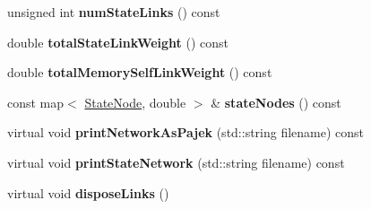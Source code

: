 \begin{DoxyCompactItemize}
unsigned int {\bfseries num\+State\+Links} () const
\item 
\mbox{\label{classMemNetwork_ac87bd8997dbd5838bbad40e0add47ef8}} 
double {\bfseries total\+State\+Link\+Weight} () const
\item 
\mbox{\label{classMemNetwork_a3296368c20f34b50799a386d1ae05630}} 
double {\bfseries total\+Memory\+Self\+Link\+Weight} () const
\item 
\mbox{\label{classMemNetwork_af11e1ae05b9c7bbc3a94191891a1e173}} 
const map$<$ \mbox{\hyperlink{structStateNode}{State\+Node}}, double $>$ \& {\bfseries state\+Nodes} () const
\item 
\mbox{\label{classMemNetwork_a62129dba818fb621ec3918496039aadd}} 
virtual void {\bfseries print\+Network\+As\+Pajek} (std\+::string filename) const
\item 
\mbox{\label{classMemNetwork_abc53094afd486d22794161aeea271c79}} 
virtual void {\bfseries print\+State\+Network} (std\+::string filename) const
\item 
\mbox{\label{classMemNetwork_a46cb150d68448f2dbf85805f20261d76}} 
virtual void {\bfseries dispose\+Links} ()
\end{DoxyCompactItemize}
